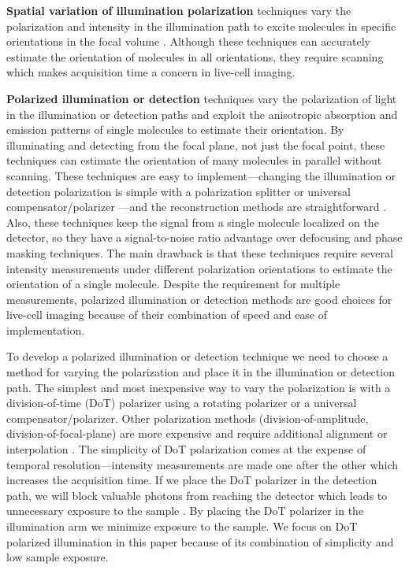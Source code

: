 \documentclass[10pt]{article}
\begin{document}
\textbf{Spatial variation of illumination polarization} techniques vary the
polarization and intensity in the illumination path to excite molecules in
specific orientations in the focal volume \cite{debarre2004}. Although these
techniques can accurately estimate the orientation of molecules in all
orientations, they require scanning which makes acquisition time a concern in
live-cell imaging.

\textbf{Polarized illumination or detection} techniques vary the polarization of
light in the illumination or detection paths and exploit the anisotropic
absorption and emission patterns of single molecules to estimate their
orientation. By illuminating and detecting from the focal plane, not just the
focal point, these techniques can estimate the orientation of many molecules in
parallel without scanning. These techniques are easy to implement---changing the
illumination or detection polarization is simple with a polarization splitter
\cite{mehta2016} or universal compensator/polarizer \cite{shribak2003}---and the
reconstruction methods are straightforward \cite{fourkas2001, mehta2016,
  backer2016}. Also, these techniques keep the signal from a single molecule
localized on the detector, so they have a signal-to-noise ratio advantage over
defocusing and phase masking techniques. The main drawback is that these
techniques require several intensity measurements under different polarization
orientations to estimate the orientation of a single molecule. Despite the
requirement for multiple measurements, polarized illumination or detection
methods are good choices for live-cell imaging because of their combination of
speed and ease of implementation.

To develop a polarized illumination or detection technique we need to choose a
method for varying the polarization and place it in the illumination or
detection path. The simplest and most inexpensive way to vary the polarization
is with a division-of-time (DoT) polarizer using a rotating polarizer or a
universal compensator/polarizer. Other polarization methods
(division-of-amplitude, division-of-focal-plane) are more expensive and require
additional alignment or interpolation \cite{tyo2006}. The simplicity of DoT
polarization comes at the expense of temporal resolution---intensity
measurements are made one after the other which increases the acquisition
time. If we place the DoT polarizer in the detection path, we will block
valuable photons from reaching the detector which leads to unnecessary exposure
to the sample \cite{demay2011}. By placing the DoT polarizer in the illumination
arm we minimize exposure to the sample. We focus on DoT polarized illumination
in this paper because of its combination of simplicity and low sample exposure.
\end{document}
